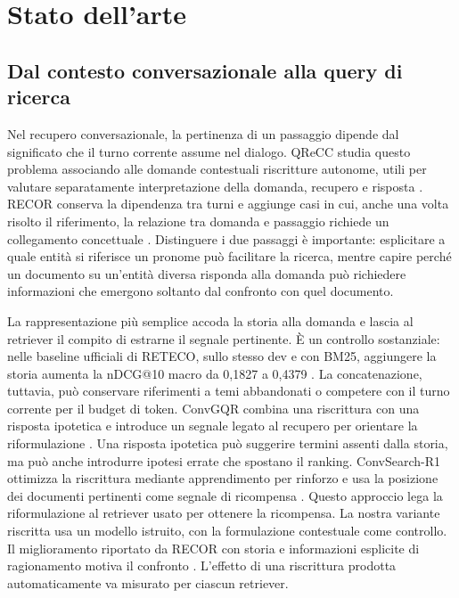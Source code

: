 \section{Stato dell'arte}

\subsection{Dal contesto conversazionale alla query di ricerca}
Nel recupero conversazionale, la pertinenza di un passaggio dipende dal significato che il turno corrente assume nel dialogo. QReCC studia questo problema associando alle domande contestuali riscritture autonome, utili per valutare separatamente interpretazione della domanda, recupero e risposta \cite{qrecc}. RECOR conserva la dipendenza tra turni e aggiunge casi in cui, anche una volta risolto il riferimento, la relazione tra domanda e passaggio richiede un collegamento concettuale \cite{recor}. Distinguere i due passaggi è importante: esplicitare a quale entità si riferisce un pronome può facilitare la ricerca, mentre capire perché un documento su un'entità diversa risponda alla domanda può richiedere informazioni che emergono soltanto dal confronto con quel documento.

La rappresentazione più semplice accoda la storia alla domanda e lascia al retriever il compito di estrarne il segnale pertinente. È un controllo sostanziale: nelle baseline ufficiali di RETECO, sullo stesso dev e con BM25, aggiungere la storia aumenta la nDCG@10 macro da 0,1827 a 0,4379 \cite{data}. La concatenazione, tuttavia, può conservare riferimenti a temi abbandonati o competere con il turno corrente per il budget di token. ConvGQR combina una riscrittura con una risposta ipotetica e introduce un segnale legato al recupero per orientare la riformulazione \cite{convgqr}. Una risposta ipotetica può suggerire termini assenti dalla storia, ma può anche introdurre ipotesi errate che spostano il ranking. ConvSearch-R1 ottimizza la riscrittura mediante apprendimento per rinforzo e usa la posizione dei documenti pertinenti come segnale di ricompensa \cite{convsearchr1}. Questo approccio lega la riformulazione al retriever usato per ottenere la ricompensa. La nostra variante riscritta usa un modello istruito, con la formulazione contestuale come controllo. Il miglioramento riportato da RECOR con storia e informazioni esplicite di ragionamento motiva il confronto \cite{recor}. L'effetto di una riscrittura prodotta automaticamente va misurato per ciascun retriever.

